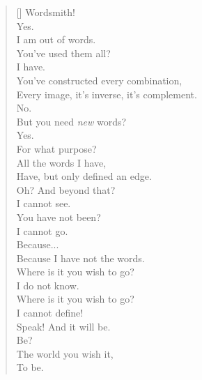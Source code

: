 \documentclass{article}
\begin{document}
\newpage

\settowidth{\versewidth}{Than Tycho Brahe, or Erra Pater:}
\begin{verse}[\versewidth]
Wordsmith! \\
Yes. \\
I am out of words. \\
You've used them all? \\
I have. \\
You've constructed every combination, \\
Every image, it's inverse, it's complement. \\
No. \\
But you need \textit{new} words? \\
Yes. \\
For what purpose? \\
All the words I have, \\
Have, but only defined an edge. \\
Oh? And beyond that? \\
I cannot see. \\
You have not been? \\
I cannot go. \\
Because... \\
Because I have not the words. \\
Where is it you wish to go? \\
I do not know. \\
Where is it you wish to go? \\
I cannot define! \\
Speak! And it will be. \\
Be? \\
The world you wish it, \\
To be. \\
\end{verse}

\newpage
\end{document}
